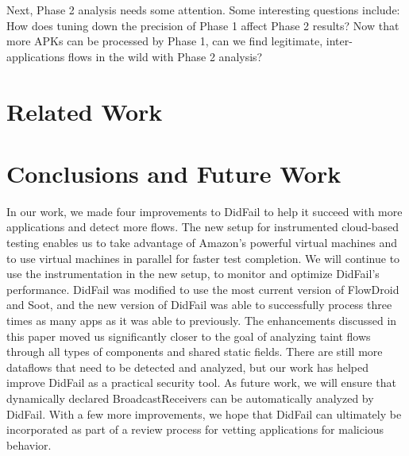 Next, Phase 2 analysis needs some attention.  Some interesting questions include: How does tuning down the precision of Phase 1 affect Phase 2 results?  Now that more APKs can be processed by Phase 1, can we find legitimate, inter-applications flows in the wild with Phase 2 analysis?

\chapter{Related Work}
\cite{li2015icse} 

\chapter{Conclusions and Future Work}

In our work, we made four improvements to DidFail to help it succeed with more applications and detect more flows. 
 The new setup for instrumented cloud-based testing enables us to take advantage of Amazon's powerful virtual machines and to use virtual machines in parallel for faster test completion. We will continue to use the instrumentation in the new setup, to monitor and optimize DidFail's performance. DidFail was modified to use the most current version of FlowDroid and Soot, and the new version of DidFail was able to successfully process three times as many apps as it was able to previously. The enhancements discussed in this paper moved us significantly closer to the goal of analyzing taint flows through all types of components and shared static fields.
There are still more dataflows that need to be detected and analyzed, but our work has helped improve DidFail as a practical security tool. As future work, we will ensure that dynamically declared BroadcastReceivers can be automatically analyzed by DidFail.
 With a few more improvements, we hope that DidFail can ultimately be incorporated as part of a review process for vetting applications for malicious behavior.


%




